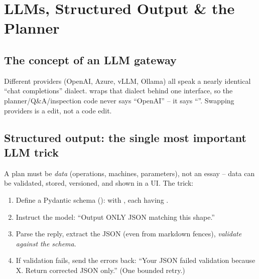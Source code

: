 
\section{LLMs, Structured Output \& the Planner}

\subsection{The concept of an LLM gateway}
Different providers (OpenAI, Azure, vLLM, Ollama) all speak a nearly identical
``chat completions'' dialect.  wraps that dialect behind one
interface, so the planner/Q\&A/inspection code never says ``OpenAI'' -- it says
``''. Swapping providers is a  edit,
not a code edit.

\subsection{Structured output: the single most important LLM trick}
A plan must be \emph{data} (operations, machines, parameters), not an essay -- data can
be validated, stored, versioned, and shown in a UI. The trick:
\begin{enumerate}[nosep]
  \item Define a Pydantic schema ():
         with , each having
        .
  \item Instruct the model: ``Output ONLY JSON matching this shape.''
  \item Parse the reply, extract the JSON (even from markdown fences),
        \emph{validate against the schema}.
  \item If validation fails, send the errors back: ``Your JSON failed validation
        because X. Return corrected JSON only.'' (One bounded retry.)
\end{enumerate}

